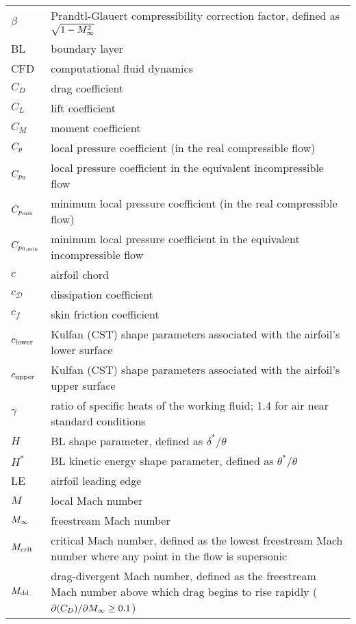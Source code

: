 \documentclass[journal]{new-aiaa}
\begin{document}
 {\renewcommand\arraystretch{1.0}
  \noindent\begin{longtable*}{@{}l @{\quad=\quad} p{5in}@{}}
      $\beta$ & Prandtl-Glauert compressibility correction factor, defined as $\sqrt{1 - M_\infty^2}$ \\
      BL & boundary layer \\
      CFD & computational fluid dynamics \\
      $C_D$ & drag coefficient \\
      $C_L$ & lift coefficient \\
      $C_M$ & moment coefficient \\
      $C_p$ & local pressure coefficient (in the real compressible flow) \\
      $C_{p_0}$ & local pressure coefficient in the equivalent incompressible flow \\
      $C_{p_{\rm min}}$ & minimum local pressure coefficient (in the real compressible flow) \\
      $C_{p_{0,\rm min}}$ & minimum local pressure coefficient in the equivalent incompressible flow \\
      $c$ & airfoil chord \\
      $c_\mathcal{D}$ & dissipation coefficient \\
      $c_f$ & skin friction coefficient \\
      $c_{\rm lower}$ & Kulfan (CST) shape parameters associated with the airfoil's lower surface \\
      $c_{\rm upper}$ & Kulfan (CST) shape parameters associated with the airfoil's upper surface \\
      $\gamma$ & ratio of specific heats of the working fluid; 1.4 for air near standard conditions \\
      $H$ & BL shape parameter, defined as $\delta^*/\theta$ \\
      $H^*$ & BL kinetic energy shape parameter, defined as $\theta^*/\theta$ \\
      LE & airfoil leading edge \\
      $M$ & local Mach number \\
      $M_\infty$ & freestream Mach number \\
      $M_{\rm crit}$ & critical Mach number, defined as the lowest freestream Mach number where any point in the flow is supersonic \\
      $M_{\rm dd}$ & drag-divergent Mach number, defined as the freestream Mach number above which drag begins to rise rapidly ($\partial(C_D)/\partial M_\infty \geq 0.1$) \\

\end{longtable*}}
\end{document}
